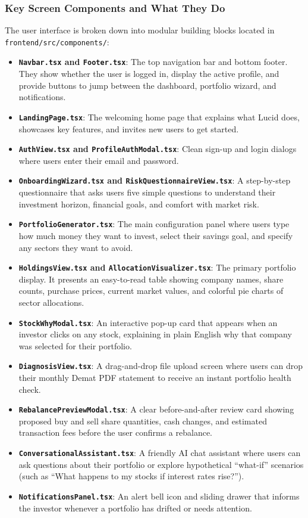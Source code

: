 \subsubsection{Key Screen Components and What They Do}
The user interface is broken down into modular building blocks located in \texttt{frontend/src/components/}:
\begin{itemize}
    \item \textbf{\texttt{Navbar.tsx} and \texttt{Footer.tsx}}: The top navigation bar and bottom footer. They show whether the user is logged in, display the active profile, and provide buttons to jump between the dashboard, portfolio wizard, and notifications.
    \item \textbf{\texttt{LandingPage.tsx}}: The welcoming home page that explains what Lucid does, showcases key features, and invites new users to get started.
    \item \textbf{\texttt{AuthView.tsx} and \texttt{ProfileAuthModal.tsx}}: Clean sign-up and login dialogs where users enter their email and password.
    \item \textbf{\texttt{OnboardingWizard.tsx} and \texttt{RiskQuestionnaireView.tsx}}: A step-by-step questionnaire that asks users five simple questions to understand their investment horizon, financial goals, and comfort with market risk.
    \item \textbf{\texttt{PortfolioGenerator.tsx}}: The main configuration panel where users type how much money they want to invest, select their savings goal, and specify any sectors they want to avoid.
    \item \textbf{\texttt{HoldingsView.tsx} and \texttt{AllocationVisualizer.tsx}}: The primary portfolio display. It presents an easy-to-read table showing company names, share counts, purchase prices, current market values, and colorful pie charts of sector allocations.
    \item \textbf{\texttt{StockWhyModal.tsx}}: An interactive pop-up card that appears when an investor clicks on any stock, explaining in plain English why that company was selected for their portfolio.
    \item \textbf{\texttt{DiagnosisView.tsx}}: A drag-and-drop file upload screen where users can drop their monthly Demat PDF statement to receive an instant portfolio health check.
    \item \textbf{\texttt{RebalancePreviewModal.tsx}}: A clear before-and-after review card showing proposed buy and sell share quantities, cash changes, and estimated transaction fees before the user confirms a rebalance.
    \item \textbf{\texttt{ConversationalAssistant.tsx}}: A friendly AI chat assistant where users can ask questions about their portfolio or explore hypothetical ``what-if'' scenarios (such as ``What happens to my stocks if interest rates rise?'').
    \item \textbf{\texttt{NotificationsPanel.tsx}}: An alert bell icon and sliding drawer that informs the investor whenever a portfolio has drifted or needs attention.
\end{itemize}

